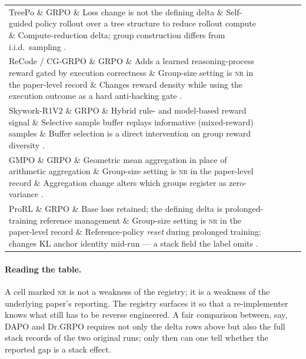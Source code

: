 \documentclass[11pt]{article}
\newcommand{\nr}{\textsc{nr}}
\newcommand{\grpo}{\textsc{GRPO}}
\begin{document}
\begin{longtable}{@{}p{2.1cm}p{2.4cm}p{3.0cm}p{2.0cm}p{3.3cm}@{}}
TreePo \& \grpo{} \& Loss change is not the defining delta \& Self-guided policy rollout over a
  tree structure to reduce rollout compute \& Compute-reduction delta; group
  construction differs from i.i.d.\ sampling \cite{treepo2025,agenticrlsurvey2026}.\\
\addlinespace

ReCode / CG-\grpo{} \& \grpo{} \& Adds a learned reasoning-process reward gated
  by execution correctness \& Group-size setting is \nr{} in the paper-level
  record \& Changes reward density while
  using the execution outcome as a hard anti-hacking gate
  \cite{fan2025recode,agenticrlsurvey2026}.\\
\addlinespace

Skywork-R1V2 \& \grpo{} \& Hybrid rule- and model-based reward signal \& Selective
  sample buffer replays informative (mixed-reward) samples \& Buffer selection
  is a direct intervention on group reward diversity
  \cite{skyworkr1v2-2025,agenticrlsurvey2026}.\\
\addlinespace

GMPO \& \grpo{} \& Geometric mean aggregation in place of arithmetic aggregation
  \& Group-size setting is \nr{} in the paper-level record \& Aggregation change alters which groups
  register as zero-variance \cite{gmpo2025,agenticrlsurvey2026}.\\
\addlinespace

ProRL \& \grpo{} \& Base loss retained; the defining delta is prolonged-training
  reference management \& Group-size setting is \nr{} in the paper-level record \&   Reference-policy \emph{reset} during prolonged training; changes KL anchor
  identity mid-run --- a stack field the label omits
  \cite{prorl2025,agenticrlsurvey2026}.\\

\end{longtable}
\label{tab:catalog}

\paragraph{Reading the table.} A cell marked \nr{} is not a weakness of the
registry; it is a weakness of the underlying paper's reporting. The registry
surfaces it so that a re-implementer knows what still has to be reverse
engineered. A fair comparison between, say, DAPO and Dr.\grpo{} requires not
only the delta rows above but also the full stack records of the two original
runs; only then can one tell whether the reported gap is a stack effect.
\end{document}
